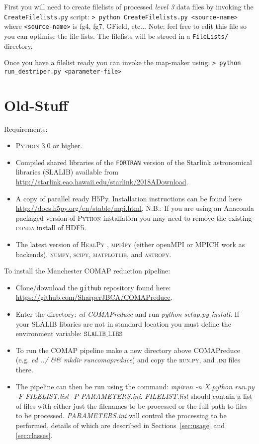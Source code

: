 \documentclass[11pt]{article}
\begin{document}
First you will need to create filelists of processed \textit{level 3} data files by invoking the \texttt{CreateFilelists.py} script:
\newline\noindent
\texttt{> python CreateFilelists.py <source-name>}
\newline\noindent
where \texttt{<source-name>} is fg4, fg7, GField, etc... Note: feel free to edit this file so you can optimise the file lists. The filelists will be stroed in a \texttt{FileLists/} directory.

Once you have a filelist ready you can invoke the map-maker using:
\newline\noindent
\texttt{> python run\_destriper.py <parameter-file>}
\newline\noindent


\section{Old-Stuff}

Requirements:
\begin{itemize}
\item \textsc{Python} 3.0 or higher.
\item Compiled shared libraries of the \texttt{FORTRAN} version of the Starlink astronomical libraries (SLALIB) available from \url{http://starlink.eao.hawaii.edu/starlink/2018ADownload}.
\item A copy of parallel ready H5Py. Installation instructions can be found here \url{http://docs.h5py.org/en/stable/mpi.html}. N.B.: If you are using an Anaconda packaged version of \textsc{Python} installation you may need to remove the existing \textsc{conda} install of HDF5.
\item The latest version of \textsc{HealPy} , \textsc{mpi4py} (either openMPI or MPICH work as backends), \textsc{numpy}, \textsc{scipy}, \textsc{matplotlib}, and \textsc{astropy}.
\end{itemize}

To install the Manchester COMAP reduction pipeline:
\begin{itemize}
  \item Clone/download the \texttt{github} repository found here: \url{https://github.com/SharperJBCA/COMAPreduce}.
  \item Enter the directory: \textit{cd COMAPreduce} and run \textit{python setup.py install}. If your SLALIB libaries are not in standard location you must define the environment variable: $\texttt{SLALIB\_LIBS}$
  \item To run the COMAP pipeline make a new directory above COMAPreduce (e.g. \textit{cd ../ \&\& mkdir runcomapreduce}) and copy the \textsc{run.py}, and \textsc{\*.ini} files there.
  \item The pipeline can then be run using the command: \textit{mpirun -n X python run.py -F FILELIST.list -P PARAMETERS.ini}. \textit{FILELIST.list} should contain a list of files with either just the filenames to be processed or the full path to files to be processed. \textit{PARAMETERS.ini} will control the processing to be performed, details of which are described in Sections~\ref{sec:usage} and \ref{sec:classes}.
\end{itemize}
\end{document}
